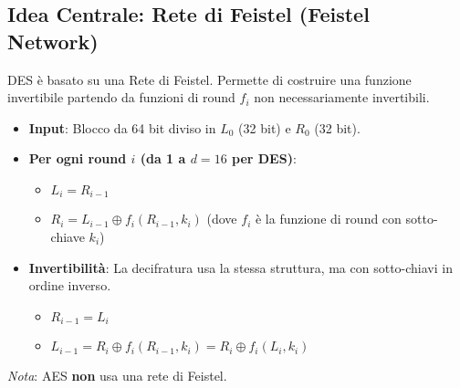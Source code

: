 \subsection{Idea Centrale: Rete di Feistel (Feistel Network)}
DES è basato su una Rete di Feistel. Permette di costruire una funzione invertibile partendo da funzioni di round $f_i$ non necessariamente invertibili.
\begin{itemize}
    \item \textbf{Input}: Blocco da 64 bit diviso in $L_0$ (32 bit) e $R_0$ (32 bit).
    \item \textbf{Per ogni round $i$ (da 1 a $d=16$ per DES)}:
    \begin{itemize}
        \item $L_i = R_{i-1}$
        \item $R_i = L_{i-1} \oplus f_i(R_{i-1}, k_i)$ (dove $f_i$ è la funzione di round con sotto-chiave $k_i$)
    \end{itemize}
    \item \textbf{Invertibilità}: La decifratura usa la stessa struttura, ma con sotto-chiavi in ordine inverso.
        \begin{itemize}
            \item $R_{i-1} = L_i$
            \item $L_{i-1} = R_i \oplus f_i(R_{i-1}, k_i) = R_i \oplus f_i(L_i, k_i)$
        \end{itemize}
\end{itemize}
\textit{Nota}: AES \textbf{non} usa una rete di Feistel.

